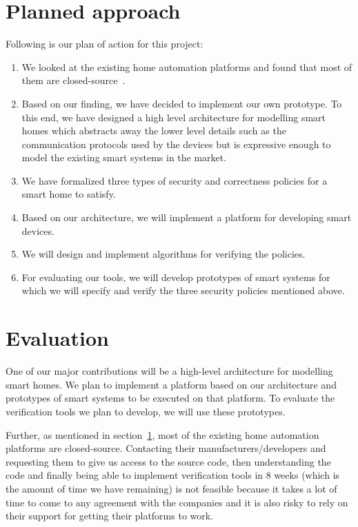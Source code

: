 \documentclass{article}
\begin{document}
\section{Planned approach}
\label{sec:plannedapp}
Following is our plan of action for this project:
\begin{enumerate}
\item We looked at the existing home automation platforms and found that most of them are closed-source~\cite{homeos, echo, wink, homekit, samsung}.  
\item Based on our finding, we have decided to implement our own prototype. To this end, we have designed a high level architecture for modelling smart homes which abstracts away the lower level details such as the communication protocols used by the devices but is expressive enough to model the existing smart systems in the market. 
\item  We have formalized three types of security and correctness policies for a smart home to satisfy. 
\item Based on our architecture, we will implement a platform for developing smart devices.
\item We will design and implement algorithms for verifying the policies.
\item For evaluating our tools, we will develop prototypes of smart systems for which we will specify and verify the three security policies mentioned above.
\end{enumerate}

\section{Evaluation}
One of our major contributions will be a high-level architecture for modelling smart homes. We plan to implement a platform based on our architecture and prototypes of smart systems to be executed on that platform. To evaluate the verification tools we plan to develop, we will use these prototypes. 

Further, as mentioned in section~\ref{sec:plannedapp}, most of the existing home automation platforms are closed-source. Contacting their manufacturers/developers and requesting them to give us access to the source code, then understanding the code and finally being able to implement verification tools in 8 weeks (which is the amount of time we have remaining) is not feasible because it takes a lot of time to come to any agreement with the companies and it is also risky to rely on their support for getting their platforms to work.    
\end{document}

